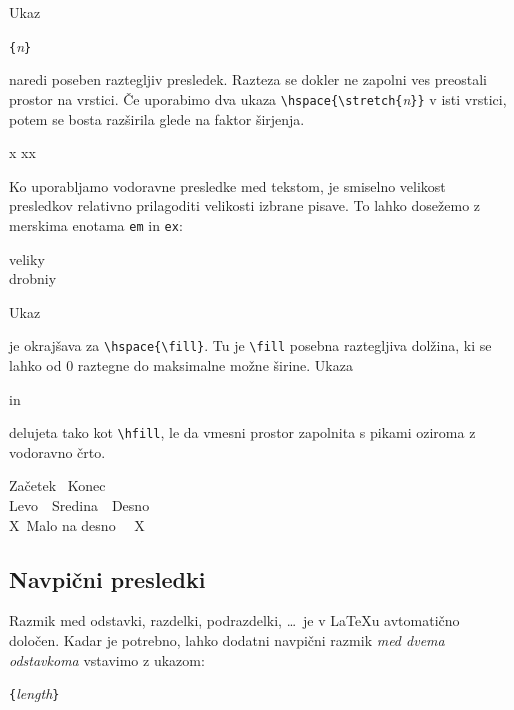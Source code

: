 \label{cmd:stretch} 
Ukaz
\begin{lscommand}
\verb|{|\emph{n}\verb|}|
\end{lscommand} 
\noindent naredi poseben raztegljiv presledek. Razteza se dokler ne zapolni ves
preostali prostor na vrstici. Če uporabimo dva ukaza 
\verb|\hspace{\stretch{|\emph{n}\verb|}}| v isti vrstici, potem se bosta razširila glede na faktor širjenja.

\begin{example}
x
xx
\end{example}

Ko uporabljamo vodoravne presledke med tekstom, je smiselno velikost 
presledkov relativno prilagoditi velikosti izbrane pisave. To lahko
dosežemo z merskima enotama \texttt{em} in
\texttt{ex}:

\begin{example}
{\Large{}velik\hspace{1em}y}\\
{\tiny{}drobni\hspace{1em}y}
\end{example}

Ukaz 
\begin{lscommand}
\end{lscommand}
\noindent je okrajšava za \verb|\hspace{\fill}|. Tu je \verb|\fill| posebna raztegljiva  dolžina, ki se lahko od 0
raztegne do maksimalne možne širine. Ukaza
\begin{lscommand}
\quad in\quad {}
\end{lscommand} 
\noindent delujeta tako kot \verb|\hfill|, le da vmesni prostor zapolnita s pikami oziroma z vodoravno črto.

\begin{example}
Začetek \dotfill\ Konec\\
Levo\ \hrulefill\ Sredina\ 
  \hrulefill\ Desno\\
X\ \hfill\hfill Malo na desno 
  \ \hfill\ X
\end{example}

\subsection{Navpični presledki}

Razmik med odstavki, razdelki, podrazdelki, \ldots\ je v \LaTeX{}u avtomatično določen.
Kadar je potrebno, lahko dodatni navpični razmik \emph{med dvema odstavkoma} vstavimo z ukazom:
\begin{lscommand}
\verb|{|\emph{length}\verb|}|
\end{lscommand}


